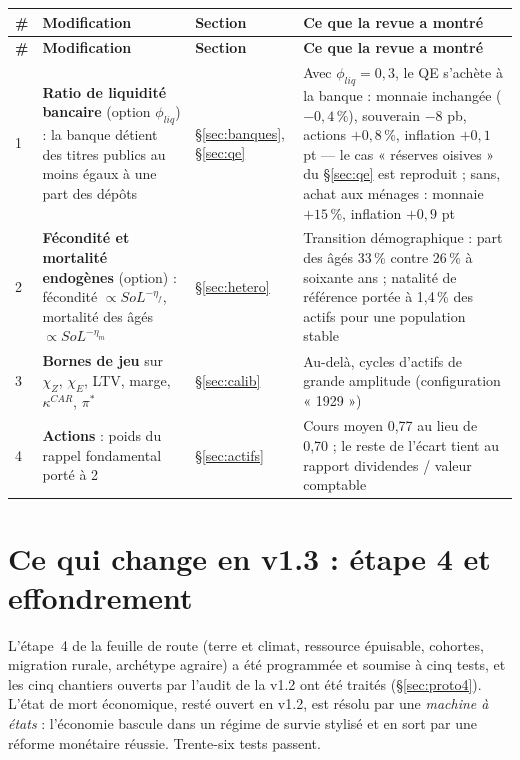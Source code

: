 \documentclass[11pt,a4paper]{article}
\begin{document}
\begin{center}\small
\begin{longtable}{p{0.5cm}p{6.6cm}p{2.1cm}p{5.8cm}}
\toprule
\textbf{\#} & \textbf{Modification} & \textbf{Section} & \textbf{Ce que la revue a montré}\\
\midrule
\endfirsthead
\toprule
\textbf{\#} & \textbf{Modification} & \textbf{Section} & \textbf{Ce que la revue a montré}\\
\midrule
\endhead
1 & \textbf{Ratio de liquidité bancaire} (option $\phi_{liq}$) : la banque détient des titres publics au moins égaux à une part des dépôts & \S\ref{sec:banques}, \S\ref{sec:qe} & Avec $\phi_{liq}=0{,}3$, le QE s'achète à la banque : monnaie inchangée ($-0{,}4\,\%$), souverain $-8$ pb, actions $+0{,}8\,\%$, inflation $+0{,}1$ pt — le cas « réserves oisives » du \S\ref{sec:qe} est reproduit ; sans, achat aux ménages : monnaie $+15\,\%$, inflation $+0{,}9$ pt\\
2 & \textbf{Fécondité et mortalité endogènes} (option) : fécondité $\propto SoL^{-\eta_f}$, mortalité des âgés $\propto SoL^{-\eta_m}$ & \S\ref{sec:hetero} & Transition démographique : part des âgés 33\,\% contre 26\,\% à soixante ans ; natalité de référence portée à 1,4\,\% des actifs pour une population stable\\
3 & \textbf{Bornes de jeu} sur $\chi_Z$, $\chi_E$, LTV, marge, $\kappa^{CAR}$, $\pi^\ast$ & \S\ref{sec:calib} & Au-delà, cycles d'actifs de grande amplitude (configuration « 1929 »)\\
4 & \textbf{Actions} : poids du rappel fondamental porté à 2 & \S\ref{sec:actifs} & Cours moyen 0,77 au lieu de 0,70 ; le reste de l'écart tient au rapport dividendes / valeur comptable\\
\bottomrule
\end{longtable}
\end{center}

\section*{Ce qui change en v1.3 : étape 4 et effondrement}
L'étape~4 de la feuille de route (terre et climat, ressource épuisable, cohortes, migration rurale, archétype agraire) a été programmée et soumise à cinq tests, et les cinq chantiers ouverts par l'audit de la v1.2 ont été traités (\S\ref{sec:proto4}). L'état de mort économique, resté ouvert en v1.2, est résolu par une \emph{machine à états} : l'économie bascule dans un régime de survie stylisé et en sort par une réforme monétaire réussie. Trente-six tests passent.
\end{document}
